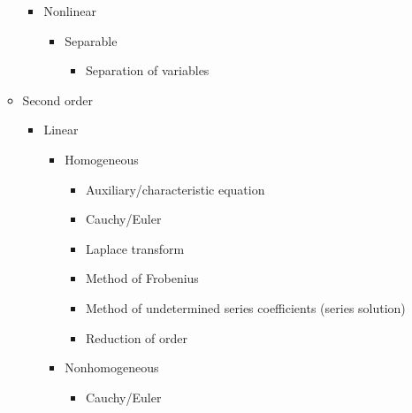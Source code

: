 \documentclass{article}
\begin{document}
\begin{itemize}
\begin{itemize}
\begin{itemize}
                  \item Nonlinear

                        \begin{itemize}
                          \item Separable

                                \begin{itemize}
                                  \item Separation of variables
                                \end{itemize}
                        \end{itemize}
                \end{itemize}

          \item Second order

                \begin{itemize}
                  \item Linear

                        \begin{itemize}
                          \item Homogeneous

                                \begin{itemize}
                                  \item Auxiliary/characteristic equation

                                  \item Cauchy/Euler

                                  \item Laplace transform

                                  \item Method of Frobenius

                                  \item Method of undetermined series coefficients (series solution)

                                  \item Reduction of order
                                \end{itemize}

                          \item Nonhomogeneous

                                \begin{itemize}
                                  \item Cauchy/Euler


\end{itemize}
\end{itemize}
\end{itemize}
\end{itemize}
\end{itemize}
\end{document}
